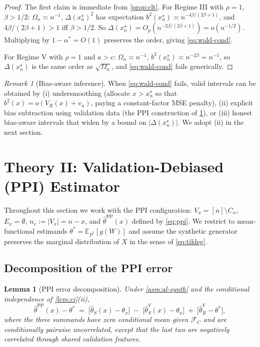 \documentclass[11pt]{article}
\theoremstyle{plain}
\newtheorem{lemma}[theorem]{Lemma}
\theoremstyle{definition}
\theoremstyle{remark}
\newtheorem{remark}[theorem]{Remark}
\newcommand{\E}{\mathbb{E}}
\begin{document}
\begin{proof}
The first claim is immediate from \cref{prop:clt}. For Regime III with $\rho=1$, $\beta>1/2$: $\Omega_n\asymp n^{-1}$, $\Delta(x_n^\star)^2$ has expectation $b^2(x_n^\star)\asymp n^{-4\beta/(2\beta+1)}$, and $4\beta/(2\beta+1)>1$ iff $\beta>1/2$. So $\Delta(x_n^\star)=O_p(n^{-2\beta/(2\beta+1)})=o(n^{-1/2})$. Multiplying by $1-\alpha^*=O(1)$ preserves the order, giving \cref{eq:wald-cond}.

For Regime V with $\rho=1$ and $a>c$: $\Omega_n\asymp n^{-1}$, $b^2(x_n^\star)\asymp n^{-2\beta}=n^{-1}$, so $\Delta(x_n^\star)$ is the same order as $\sqrt{\Omega_n}$, and \cref{eq:wald-cond} fails generically.
\end{proof}

\begin{remark}[Bias-aware inference]\label{rem:bias-aware}
When \cref{eq:wald-cond} fails, valid intervals can be obtained by (i) undersmoothing (allocate $x>x_n^\star$ so that $b^2(x)=o(V_R(x)+v_n)$, paying a constant-factor MSE penalty), (ii) explicit bias subtraction using validation data (the PPI construction of \cref{sec:ppi}), or (iii) honest bias-aware intervals that widen by a bound on $|\Delta(x_n^\star)|$. We adopt (ii) in the next section.
\end{remark}

\section{Theory II: Validation-Debiased (PPI) Estimator}
\label{sec:ppi}

Throughout this section we work with the PPI configuration: $V_x=[n]\setminus C_x$, $E_x=\emptyset$, $n_v:=|V_x|=n-x$, and $\hat\theta^{\mathrm{PP}}(x)$ defined by \cref{eq:ppi}. We restrict to mean-functional estimands $\theta^*=\E_{P^*}[g(W)]$ and assume the synthetic generator preserves the marginal distribution of $X$ in the sense of \cref{eq:tildeg}.

\subsection{Decomposition of the PPI error}
\label{ssec:ppi-decomp}

\begin{lemma}[PPI error decomposition]\label{lem:ppi-decomp}
Under \cref{asm:al-synth} and the conditional independence of \cref{lem:ci}(ii),
\begin{equation}\label{eq:ppi-decomp}
\hat\theta^{\mathrm{PP}}(x)-\theta^*\;=\;\bigl[\hat\theta_S(x)-\theta_x\bigr]\;-\;\bigl[\hat\theta_S^V(x)-\theta_x\bigr]\;+\;\bigl[\hat\theta_R^V-\theta^*\bigr],
\end{equation}
where the three summands have zero conditional mean given $\mathcal{F}_C$ and are conditionally pairwise uncorrelated, except that the last two are negatively correlated through shared validation features.
\end{lemma}
\end{document}
